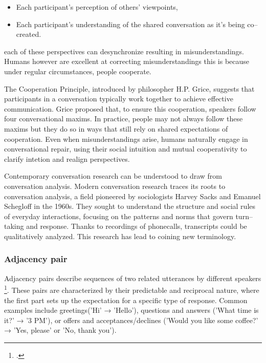 \documentclass[12pt]{report}
\begin{document}
{\begin{itemize}
\begin{itemize}
            \item
            Each participant’s perception of others’ viewpoints,

            \item
            Each participant’s understanding of the shared conversation as it’s being co–created.
        \end{itemize}
\end{itemize}

        each of these perspectives can desynchronize resulting in misunderstandings.
        Humans however are excellent at correcting misunderstandings
        this is because under regular circumstances, people cooperate.

\par
The Cooperation Principle, introduced by philosopher H.P. Grice,
suggests that participants in a conversation typically work together to achieve effective communication.
Grice proposed that, to ensure this cooperation, speakers follow four conversational maxims.
In practice, people may not always follow these maxims
but they do so in ways that still rely on shared expectations of cooperation.
Even when misunderstandings arise,
humans naturally engage in conversational repair,
using their social intuition and mutual cooperativity to clarify intetion and realign perspectives.

\par
Contemporary conversation research can be understood to draw from conversation analysis.
Modern conversation research traces its roots to conversation analysis,
a field pioneered by sociologists Harvey Sacks and Emanuel Schegloff in the 1960s.
They sought to understand the structure and
social rules of everyday interactions,
focusing on the patterns and norms that govern turn–taking and response.
Thanks to recordings of phonecalls,
transcripts could be qualitatively analyzed.
This research has lead to coining new terminology.

    \subsubsection{Adjacency pair}
    \par
    Adjacency pairs describe sequences of two related utterances by different speakers \footcite[p.~188]{Sacks1992}. These pairs are characterized by their predictable and reciprocal nature, where the first part sets up the expectation for a specific type of response. Common examples include greetings('Hi' → 'Hello'), questions and answers ('What time is it?' → '3 PM'), or offers and acceptances/declines ('Would you like some coffee?' → 'Yes, please' or 'No, thank you').

}
\end{document}
